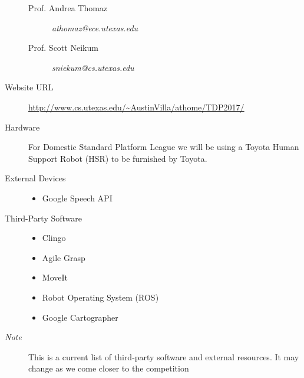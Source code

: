 \begin{description}
\begin{description}
\item[Prof. Andrea Thomaz] \textit{athomaz@ece.utexas.edu}
\item[Prof. Scott Neikum] \textit{sniekum@cs.utexas.edu }
\end{description}
\item[Website URL]\url{http://www.cs.utexas.edu/~AustinVilla/athome/TDP2017/}
\item[Hardware] For Domestic Standard Platform League we will be using a Toyota Human Support Robot (HSR) to be furnished by Toyota.
\item[External Devices] \hfill 
\begin{itemize}
\item Google Speech API
\end{itemize}
\item[Third-Party Software] \hfill
\begin{itemize}
\item Clingo
\item Agile Grasp
\item MoveIt
\item Robot Operating System (ROS)
\item Google Cartographer
\end{itemize}
\item[\textit{Note}] This is a current list of third-party software and external resources. It may change as we come closer to the competition

\end{description}
